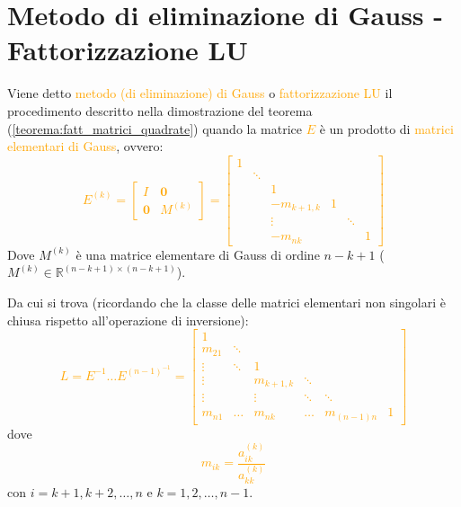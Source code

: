 \section{Metodo di eliminazione di Gauss - Fattorizzazione LU} 

\begin{defi}
   Viene detto \textcolor{orange}{metodo (di eliminazione) di Gauss} o \textcolor{orange}{fattorizzazione LU} il procedimento
   descritto nella dimostrazione del teorema (\ref{teorema:fatt_matrici_quadrate}) quando la matrice \textcolor{orange}{$E$} è un
   prodotto di \textcolor{orange}{matrici elementari di Gauss}, ovvero:
   \textcolor{orange}{\[
   E^{(k)} = \begin{bmatrix}
    I & \mathbf{0}\\
    \mathbf{0} & M^{(k)}
   \end{bmatrix} =
   \begin{bmatrix}
    1 & \\
    & \ddots \\
    & & 1 \\
    & & -m_{k+1,k} & 1 \\
    & & \vdots & & \ddots \\
    & & -m_{nk} & & & 1
   \end{bmatrix}
    \]}
    Dove $M^{(k)}$ è una matrice elementare di Gauss di ordine $n-k+1$ ($M^{(k)} \in \mathbb{R}^{(n-k+1) \times (n-k+1)}$).

    Da cui si trova (ricordando che la classe delle matrici elementari non singolari è chiusa rispetto all'operazione di inversione):
    \textcolor{orange}{\[
    L = E^{-1} \dots E^{(n-1)^{-1}} = \begin{bmatrix}
    1 & \\
    m_{21} & \ddots \\
    \vdots &  \ddots & 1\\
    \vdots & &  m_{k+1,k} & \ddots \\
    \vdots & &  \vdots & \ddots & \ddots\\
    m_{n1} & \dots &  m_{nk} & \dots & m_{(n-1)n} & 1
    \end{bmatrix}
    \]}
    dove \textcolor{orange}{\[
    m_{ik} = \frac{a_{ik}^{(k)}}{a_{kk}^{(k)}}
    \]}
    con $i = k+1, k+2, \ldots, n$ e $k = 1, 2, \ldots, n-1$.
\end{defi}

